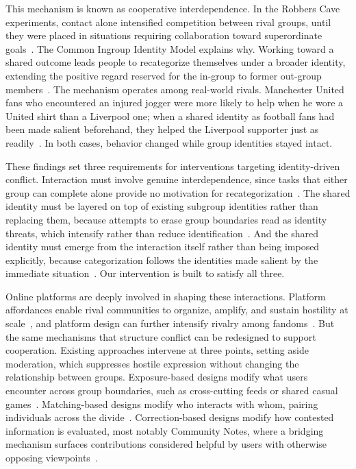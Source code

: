 \documentclass[manuscript,screen,review,anonymous]{acmart}
\begin{document}
This mechanism is known as cooperative interdependence. In the Robbers Cave
experiments, contact alone intensified competition between rival groups,
until they were placed in situations requiring collaboration toward
superordinate goals~\cite{sherif1954}. The Common Ingroup Identity Model
explains why. Working toward a shared outcome leads people to recategorize
themselves under a broader identity, extending the positive regard reserved
for the in-group to former out-group members~\cite{gaertner2000}. The
mechanism operates among real-world rivals. Manchester United fans who
encountered an injured jogger were more likely to help when he wore a United
shirt than a Liverpool one; when a shared identity as football fans had been
made salient beforehand, they helped the Liverpool supporter just as
readily~\cite{levine2005}. In both cases, behavior changed while group
identities stayed intact.

These findings set three requirements for interventions targeting
identity-driven conflict. Interaction must involve genuine interdependence,
since tasks that either group can complete alone provide no motivation for
recategorization~\cite{gaertner2000}. The shared identity must be layered on
top of existing subgroup identities rather than replacing them, because
attempts to erase group boundaries read as identity threats, which intensify
rather than reduce identification~\cite{branscombe1999, hornsey2000}. And the
shared identity must emerge from the interaction itself rather than being
imposed explicitly, because categorization follows the identities made
salient by the immediate situation~\cite{turner1987, levine2005}. Our
intervention is built to satisfy all three.

Online platforms are deeply involved in shaping these interactions. Platform
affordances enable rival communities to organize, amplify, and sustain
hostility at scale~\cite{marwick2021}, and platform design can further
intensify rivalry among fandoms~\cite{yin2020}. But the same mechanisms that
structure conflict can be redesigned to support cooperation. Existing
approaches intervene at three points, setting aside moderation, which
suppresses hostile expression without changing the relationship between
groups. Exposure-based designs modify what users encounter across group
boundaries, such as cross-cutting feeds or shared casual
games~\cite{bail2018, guess2023}. Matching-based designs modify who interacts
with whom, pairing individuals across the divide~\cite{combs2023}.
Correction-based designs modify how contested information is evaluated, most
notably Community Notes, where a bridging mechanism surfaces contributions
considered helpful by users with otherwise opposing
viewpoints~\cite{wojcik2022}.
\end{document}
